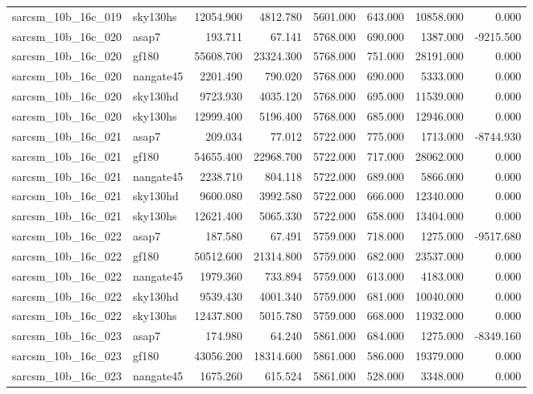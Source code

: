 \begin{tabular}{llrrrrrr}
sarcsm\_10b\_16c\_019 & sky130hs & 12054.900 & 4812.780 & 5601.000 & 643.000 & 10858.000 & 0.000 \\
sarcsm\_10b\_16c\_020 & asap7 & 193.711 & 67.141 & 5768.000 & 690.000 & 1387.000 & -9215.500 \\
sarcsm\_10b\_16c\_020 & gf180 & 55608.700 & 23324.300 & 5768.000 & 751.000 & 28191.000 & 0.000 \\
sarcsm\_10b\_16c\_020 & nangate45 & 2201.490 & 790.020 & 5768.000 & 690.000 & 5333.000 & 0.000 \\
sarcsm\_10b\_16c\_020 & sky130hd & 9723.930 & 4035.120 & 5768.000 & 695.000 & 11539.000 & 0.000 \\
sarcsm\_10b\_16c\_020 & sky130hs & 12999.400 & 5196.400 & 5768.000 & 685.000 & 12946.000 & 0.000 \\
sarcsm\_10b\_16c\_021 & asap7 & 209.034 & 77.012 & 5722.000 & 775.000 & 1713.000 & -8744.930 \\
sarcsm\_10b\_16c\_021 & gf180 & 54655.400 & 22968.700 & 5722.000 & 717.000 & 28062.000 & 0.000 \\
sarcsm\_10b\_16c\_021 & nangate45 & 2238.710 & 804.118 & 5722.000 & 689.000 & 5866.000 & 0.000 \\
sarcsm\_10b\_16c\_021 & sky130hd & 9600.080 & 3992.580 & 5722.000 & 666.000 & 12340.000 & 0.000 \\
sarcsm\_10b\_16c\_021 & sky130hs & 12621.400 & 5065.330 & 5722.000 & 658.000 & 13404.000 & 0.000 \\
sarcsm\_10b\_16c\_022 & asap7 & 187.580 & 67.491 & 5759.000 & 718.000 & 1275.000 & -9517.680 \\
sarcsm\_10b\_16c\_022 & gf180 & 50512.600 & 21314.800 & 5759.000 & 682.000 & 23537.000 & 0.000 \\
sarcsm\_10b\_16c\_022 & nangate45 & 1979.360 & 733.894 & 5759.000 & 613.000 & 4183.000 & 0.000 \\
sarcsm\_10b\_16c\_022 & sky130hd & 9539.430 & 4001.340 & 5759.000 & 681.000 & 10040.000 & 0.000 \\
sarcsm\_10b\_16c\_022 & sky130hs & 12437.800 & 5015.780 & 5759.000 & 668.000 & 11932.000 & 0.000 \\
sarcsm\_10b\_16c\_023 & asap7 & 174.980 & 64.240 & 5861.000 & 684.000 & 1275.000 & -8349.160 \\
sarcsm\_10b\_16c\_023 & gf180 & 43056.200 & 18314.600 & 5861.000 & 586.000 & 19379.000 & 0.000 \\
sarcsm\_10b\_16c\_023 & nangate45 & 1675.260 & 615.524 & 5861.000 & 528.000 & 3348.000 & 0.000 \\

\end{tabular}

